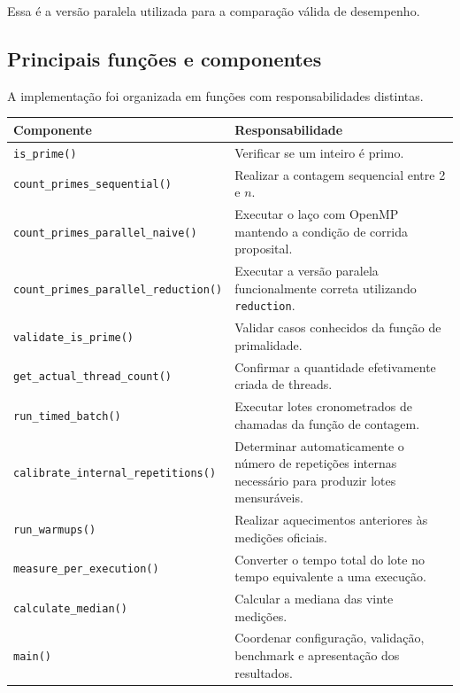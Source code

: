 Essa é a versão paralela utilizada para a comparação válida de desempenho.


\subsection{Principais funções e componentes}

A implementação foi organizada em funções com responsabilidades distintas.

\begin{center}
\begin{tabular}{|p{}|p{}|}
\hline
\textbf{Componente} & \textbf{Responsabilidade} \\
\hline
\texttt{is\_prime()} &
Verificar se um inteiro é primo. \\
\hline
\texttt{count\_primes\_sequential()} &
Realizar a contagem sequencial entre 2 e \(n\). \\
\hline
\texttt{count\_primes\_parallel\_naive()} &
Executar o laço com OpenMP mantendo a condição de corrida proposital. \\
\hline
\texttt{count\_primes\_parallel\_reduction()} &
Executar a versão paralela funcionalmente correta utilizando
\texttt{reduction}. \\
\hline
\texttt{validate\_is\_prime()} &
Validar casos conhecidos da função de primalidade. \\
\hline
\texttt{get\_actual\_thread\_count()} &
Confirmar a quantidade efetivamente criada de threads. \\
\hline
\texttt{run\_timed\_batch()} &
Executar lotes cronometrados de chamadas da função de contagem. \\
\hline
\texttt{calibrate\_internal\_repetitions()} &
Determinar automaticamente o número de repetições internas necessário
para produzir lotes mensuráveis. \\
\hline
\texttt{run\_warmups()} &
Realizar aquecimentos anteriores às medições oficiais. \\
\hline
\texttt{measure\_per\_execution()} &
Converter o tempo total do lote no tempo equivalente a uma execução. \\
\hline
\texttt{calculate\_median()} &
Calcular a mediana das vinte medições. \\
\hline
\texttt{main()} &
Coordenar configuração, validação, benchmark e apresentação dos resultados. \\
\hline
\end{tabular}
\end{center}


